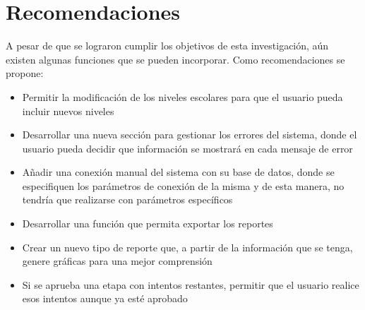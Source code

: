 \chapter*{Recomendaciones}
A pesar de que se lograron cumplir los objetivos de esta investigación, aún existen algunas funciones que se pueden incorporar. Como recomendaciones se propone:

\begin{itemize}
\item Permitir la modificación de los niveles escolares para que el usuario pueda incluir nuevos niveles
\item Desarrollar una nueva sección para gestionar los errores del sistema, donde el usuario pueda decidir que información se mostrará en cada mensaje de error
\item Añadir una conexión manual del sistema con su base de datos, donde se especifiquen los parámetros de conexión de la misma y de esta manera, no tendría que realizarse con parámetros específicos
\item Desarrollar una función que permita exportar los reportes
\item Crear un nuevo tipo de reporte que, a partir de la información que se tenga, genere gráficas para una mejor comprensión
\item Si se aprueba una etapa con intentos restantes, permitir que el usuario realice esos intentos aunque ya esté aprobado
\end{itemize}